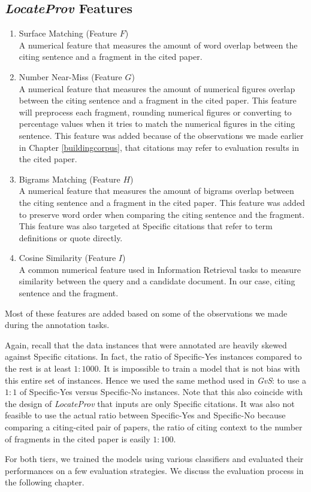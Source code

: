 \subsection*{{\it LocateProv} Features}
\begin{enumerate}
\item Surface Matching (Feature $F$)\\
A numerical feature that measures the amount of word overlap between the citing sentence and a fragment in the cited paper.

\item Number Near-Miss (Feature $G$)\\
A numerical feature that measures the amount of numerical figures overlap between the citing sentence and a fragment in the cited paper. This feature will preprocess each fragment, rounding numerical figures or converting to percentage values when it tries to match the numerical figures in the citing sentence. This feature was added because of the observations we made earlier in Chapter \ref{buildingcorpus}, that citations may refer to evaluation results in the cited paper.

\item Bigrams Matching (Feature $H$)\\
A numerical feature that measures the amount of bigrams overlap between the citing sentence and a fragment in the cited paper. This feature was added to preserve word order when comparing the citing sentence and the fragment. This feature was also targeted at Specific citations that refer to term definitions or quote directly.

\item Cosine Similarity (Feature $I$)\\
A common numerical feature used in Information Retrieval tasks to measure similarity between the query and a candidate document. In our case, citing sentence and the fragment.
\end{enumerate}
Most of these features are added based on some of the observations we made during the annotation tasks.

Again, recall that the data instances that were annotated are heavily skewed against Specific citations. In fact, the ratio of Specific-Yes instances compared to the rest is at least $1:1000$. It is impossible to train a model that is not bias with this entire set of instances. Hence we used the same method used in {\it GvS}: to use a $1:1$ of Specific-Yes versus Specific-No instances. Note that this also coincide with the design of {\it LocateProv} that inputs are only Specific citations. It was also not feasible to use the actual ratio between Specific-Yes and Specific-No because comparing a citing-cited pair of papers, the ratio of citing context to the number of fragments in the cited paper is easily $1:100$.

For both tiers, we trained the models using various classifiers and evaluated their performances on a few evaluation strategies. We discuss the evaluation process in the following chapter.